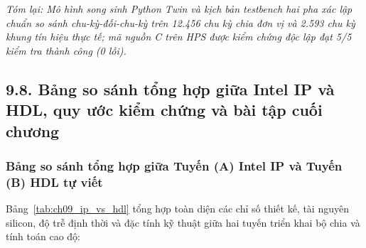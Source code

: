 \textit{Tóm lại: Mô hình song sinh Python Twin và kịch bản testbench hai pha xác lập chuẩn so sánh chu-kỳ-đối-chu-kỳ trên 12.456 chu kỳ chia đơn vị và 2.593 chu kỳ khung tín hiệu thực tế; mã nguồn C trên HPS được kiểm chứng độc lập đạt 5/5 kiểm tra thành công (0 lỗi).}

\subsection*{9.8. Bảng so sánh tổng hợp giữa Intel IP và HDL, quy ước kiểm chứng và bài tập cuối chương}

\subsubsection*{Bảng so sánh tổng hợp giữa Tuyến (A) Intel IP và Tuyến (B) HDL tự viết}
Bảng~\ref{tab:ch09_ip_vs_hdl} tổng hợp toàn diện các chỉ số thiết kế, tài nguyên silicon, độ trễ định thời và đặc tính kỹ thuật giữa hai tuyến triển khai bộ chia và tính toán cao độ:

